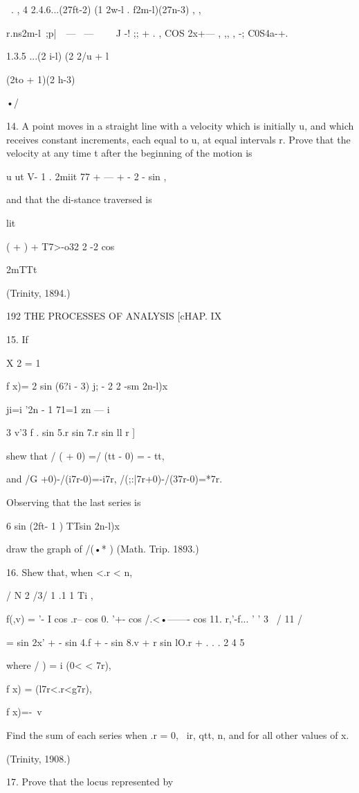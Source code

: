 {  \ . , 4 2.4.6...(27ft-2) (1 2w-l . f2m-l)(27n-3) , ,

r.ns2m-l\ ;p|\ \ — \ — \ \ \ \ J -! ;; + . , COS 2x+— , ,, , -;
C0S4a-+.

1.3.5 ...(2 i-l) (2 2/u + l

(2to + 1)(2 h-3)

•/

14. A point moves in a straight line with a velocity which is
initially u, and which receives constant increments, each equal to u,
at equal intervals r. Prove that the velocity at any time t after the
beginning of the motion is

u ut V- 1 . 2miit 77 + — + - 2 - sin ,

and that the di-stance traversed is

lit

( + ) + T7>-o32 2 -2 cos

2mTTt

(Trinity, 1894.)

192 THE PROCESSES OF ANALYSIS [cHAP. IX

15. If

X 2 = 1

f x)= 2 sin (6?i - 3) j; - 2 2 -sm 2n-l)x

ji=i '2n - 1 71=1 zn — i

3 v'3 f . sin 5.r sin 7.r sin ll r ]

shew that / ( + 0) =/ (tt - 0) = - tt,

and /G +0)-/(i7r-0)=-i7r, /(;:|7r+0)-/(37r-0)=*7r.

Observing that the last series is

6 sin (2ft- 1 ) TTsin 2n-l)x

draw the graph of /(•* ) (Math. Trip. 1893.)

16. Shew that, when <.r < n,

 / N 2 /3/ 1 .1 1 Ti , \

f(,v) = '- I cos .r-- cos 0. '+- cos /.<•——- cos 11. r,'-f... ' ' 3 \
/ 11 /

= sin 2x' + - sin 4.f + - sin 8.v + r sin lO.r + . . . 2 4 5

where / ) = i (0< < 7r),

f x) = (l7r<.r<g7r),

f x)=-\ v %

Find the sum of each series when .r = 0, \ ir, qtt, n, and for all
other values of x.

(Trinity, 1908.)

17. Prove that the locus represented by

}
